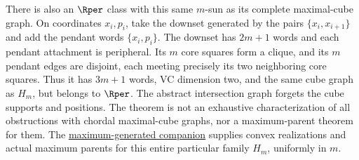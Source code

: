 \begin{remark}
\label{rem:rper-sun-graph-not-classifier}
There is also an $\Rper$ class with this same $m$-sun as its complete
maximal-cube graph. On coordinates $x_i,p_i$, take the downset generated
by the pairs $\{x_i,x_{i+1}\}$ and add the pendant words $\{x_i,p_i\}$.
The downset has $2m+1$ words and each pendant attachment is peripheral.
Its $m$ core squares form a clique, and its $m$ pendant edges are disjoint,
each meeting precisely its two neighboring core squares.
Thus it has $3m+1$ words, VC dimension two, and the same cube graph as
$H_m$, but belongs to $\Rper$.
The abstract intersection graph forgets the cube supports and positions.
The theorem is not an exhaustive characterization of all obstructions
with chordal maximal-cube graphs, nor a maximum-parent theorem for them.
The \href{../maxmin-forbidden/research/chordal_sun_parents.tex}
{maximum-generated companion} supplies convex realizations and actual
maximum parents for this entire particular family $H_m$, uniformly in $m$.
\end{remark}
